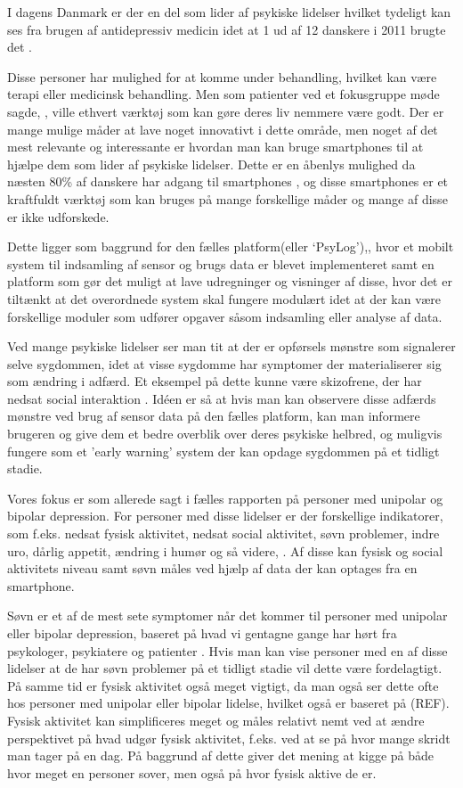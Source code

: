 I dagens Danmark er der en del som lider af psykiske lidelser hvilket tydeligt kan ses fra brugen af antidepressiv medicin idet at 1 ud af 12 danskere i 2011 brugte det \citep{misc:forbrugAntidepressiva}. 

Disse personer har mulighed for at komme under behandling, hvilket kan være terapi eller medicinsk behandling.
Men som patienter ved et fokusgruppe møde sagde, , ville ethvert værktøj som kan gøre deres liv nemmere være godt.
Der er mange mulige måder at lave noget innovativt i dette område, men noget af det mest relevante og interessante er hvordan man kan bruge smartphones til at hjælpe dem som lider af psykiske lidelser.
Dette er en åbenlys mulighed da næsten 80\% af danskere har adgang til smartphones \citep{misc:dstElektronik}, og disse smartphones er et kraftfuldt værktøj som kan bruges på mange forskellige måder og mange af disse er ikke udforskede.

Dette ligger som baggrund for den fælles platform(eller `PsyLog'),, hvor et mobilt system til indsamling af sensor og brugs data er blevet implementeret samt en platform som gør det muligt at lave udregninger og visninger af disse, hvor det er tiltænkt at det overordnede system skal fungere modulært idet at der kan være forskellige moduler som udfører opgaver såsom indsamling eller analyse af data.

Ved mange psykiske lidelser ser man tit at der er opførsels mønstre som signalerer selve sygdommen, idet at visse sygdomme har symptomer der materialiserer sig som ændring i adfærd.
Et eksempel på dette kunne være skizofrene, der har nedsat social interaktion \citep{misc:negativeSymptomsSchizo}.
Idéen er så at hvis man kan observere disse adfærds mønstre ved brug af sensor data på den fælles platform, kan man informere brugeren og give dem et bedre overblik over deres psykiske helbred, og muligvis fungere som et 'early warning' system der kan opdage sygdommen på et tidligt stadie.

Vores fokus er som allerede sagt i fælles rapporten på personer med unipolar og bipolar depression. 
For personer med disse lidelser er der forskellige indikatorer, som f.eks. nedsat fysisk aktivitet, nedsat social aktivitet, søvn problemer, indre uro, dårlig appetit, ændring i humør og så videre, .
Af disse kan fysisk og social aktivitets niveau samt søvn måles ved hjælp af data der kan optages fra en smartphone.

Søvn er et af de mest sete symptomer når det kommer til personer med unipolar eller bipolar depression, baseret på hvad vi gentagne gange har hørt fra psykologer, psykiatere og patienter .
Hvis man kan vise personer med en af disse lidelser at de har søvn problemer på et tidligt stadie vil dette være fordelagtigt.
På samme tid er fysisk aktivitet også meget vigtigt, da man også ser dette  ofte hos personer med unipolar eller bipolar lidelse, hvilket også er baseret på (REF).
Fysisk aktivitet kan simplificeres meget og måles relativt nemt ved at ændre perspektivet på hvad udgør fysisk aktivitet, f.eks. ved at se på hvor mange skridt man tager på en dag.
På baggrund af dette giver det mening at kigge på både hvor meget en personer sover, men også på hvor fysisk aktive de er.